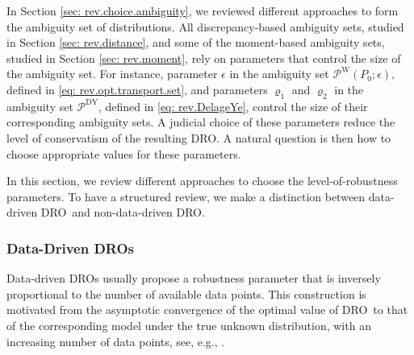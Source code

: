 \documentclass[final,onefignum,onetabnum]{class}
\newcommand{\Cs}[1]{\mathcal{#1}} %
\newcommand{\dro}{DRO}
\begin{document}

In  Section \ref{sec: rev.choice.ambiguity}, we reviewed different approaches to form the ambiguity set of distributions. All  discrepancy-based ambiguity sets, studied in Section \ref{sec: rev.distance}, and some of the moment-based ambiguity sets, studied in Section \ref{sec: rev.moment}, rely on parameters that control the size of the ambiguity set. 
For instance, parameter $\epsilon$ in the ambiguity set $\Cs{P}^{\text{W}}(P_{0}; \epsilon)$, defined in \eqref{eq: rev.opt.transport.set},  and parameters $\varrho_{1}$ and $\varrho_{2}$ in the  ambiguity set $\Cs{P}^{\text{DY}}$, defined in \eqref{eq: rev.DelageYe}, control the size of their corresponding ambiguity sets. 
A judicial choice of these parameters reduce the level of  conservatism of the resulting \dro. A natural question  is then how to choose appropriate values for these parameters. 

In this section, we review different approaches to choose the level-of-robustness parameters. To have a structured review, we  make a distinction between data-driven \dro\ and non-data-driven \dro. 

\subsubsection{Data-Driven \dro s}
Data-driven \dro s usually propose a robustness parameter that is inversely proportional to the number of available data points. %
This construction is motivated from the asymptotic convergence of the optimal value of \dro\ to that of the corresponding model under the true unknown distribution, with an increasing number of data points, see, e.g., \cite{pflug2007,delage2010,bertsimas2018RO}.  
\end{document}
